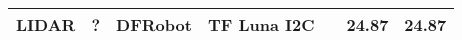 \documentclass[main.tex]{subfiles} %
\begin{document}
\begin{table}[h]
{\begin{tabular}{|p{3cm}|p{2.5cm}|p{2.5cm}|p{3cm}|p{1cm}|p{1.5cm}|p{1cm}|}
            LIDAR                             & ?                  & DFRobot                      & TF Luna I2C             &                 & 24.87                     & 24.87                       \\ \hline

\end{tabular}}
\end{table}
\end{document}
